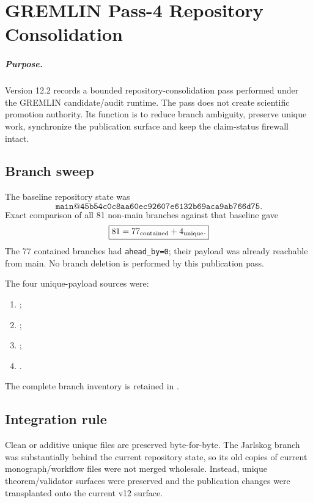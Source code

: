 \chapter{GREMLIN Pass-4 Repository Consolidation}
\label{app:v12_gremlin_pass4}

\paragraph{Purpose.}
Version 12.2 records a bounded repository-consolidation pass performed under the
GREMLIN candidate/audit runtime.  The pass does not create scientific promotion
authority.  Its function is to reduce branch ambiguity, preserve unique work,
synchronize the publication surface and keep the claim-status firewall intact.

\section{Branch sweep}

The baseline repository state was
\[
\boxed{\texttt{main@45b54c0c8aa60ec92607e6132b69aca9ab766d75}.}
\]
Exact comparison of all 81 non-main branches against that baseline gave
\[
\boxed{
81=77_{\rm contained}+4_{\rm unique}.
}
\]
The 77 contained branches had \texttt{ahead\_by=0}; their payload was already
reachable from main.  No branch deletion is performed by this publication
pass.

The four unique-payload sources were:
\begin{enumerate}
\item {};
\item {};
\item {};
\item {}.
\end{enumerate}
The complete branch inventory is retained in
.

\section{Integration rule}

Clean or additive unique files are preserved byte-for-byte.  The Jarlskog branch
was substantially behind the current repository state, so its old copies of
current monograph/workflow files were not merged wholesale.  Instead, unique
theorem/validator surfaces were preserved and the publication changes were
transplanted onto the current v12 surface.

